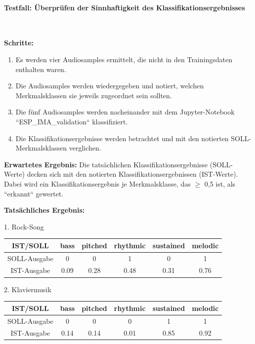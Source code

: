 \paragraph{Testfall: Überprüfen der Sinnhaftigkeit des Klassifikationsergebnisses}\mbox{}\\
\begin{adjustwidth}{0.5cm}{0cm}
\textbf{Schritte:}
\begin{enumerate}
	\item Es werden vier Audiosamples ermittelt, die nicht in den Trainingsdaten enthalten waren.
	\item Die Audiosamples werden wiedergegeben und notiert, welchen Merkmalsklassen sie jeweils zugeordnet sein sollten.
	\item Die fünf Audiosamples werden nacheinander mit dem Jupyter-Notebook ``ESP\_IMA\_validation`` klassifiziert.
	\item Die Klassifikationsergebnisse werden betrachtet und mit den notierten SOLL-Merkmalsklassen verglichen.
\end{enumerate}

\textbf{Erwartetes Ergebnis:} Die tatsächlichen Klassifikationsergebnisse (SOLL-Werte) decken sich mit den notierten Klassifikationsergebnissen (IST-Werte). Dabei wird ein Klassifikationsergebnis je Merkmalsklasse, das $\geq$ 0,5 ist, als ``erkannt`` gewertet.

\newpage

\textbf{Tatsächliches Ergebnis:}

1. Rock-Song

\begin{tabular}{|c|c|c|c|c|c|}
    \hline
    IST/SOLL & bass & pitched & rhythmic & sustained & melodic \\ \hline
    SOLL-Ausgabe & 0 & 0 & 1 & 0 & 1 \\ \hline
    IST-Ausgabe & 0.09 & 0.28 & 0.48 & 0.31 & 0.76 \\ \hline
\end{tabular}

2. Klaviermusik

\begin{tabular}{|c|c|c|c|c|c|}
    \hline
    IST/SOLL & bass & pitched & rhythmic & sustained & melodic \\ \hline
    SOLL-Ausgabe & 0 & 0 & 0 & 1 & 1 \\ \hline
    IST-Ausgabe & 0.14 & 0.14 & 0.01 & 0.85 & 0.92 \\ \hline
\end{tabular}


\end{adjustwidth}
